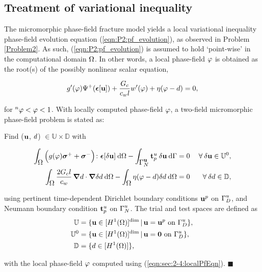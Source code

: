 \documentclass[11pt]{article}
\begin{document}
\subsection{Treatment of variational inequality}\label{sec:VarIneqLinElast}

The micromorphic phase-field fracture model yields a local variational inequality phase-field evolution equation (\ref{eqn:P2:pf_evolution}), as observed in Problem \ref{Problem2}. As such, (\ref{eqn:P2:pf_evolution}) is assumed to hold `point-wise' in the computational domain $\hbox{$\Omega$}$. In other words, a local phase-field $\hbox{$\varphi$}$ is obtained as the root(s) of the possibly nonlinear scalar equation,

\begin{equation}\label{eqn:sec:2-4:localPfEqn}
    g'(\hbox{$\varphi$}) \Psi^+(\hbox{$\hbox{\boldmath$\epsilon$}$}[\hbox{$\mathbf{u}$}]) + \dfrac{\hbox{$G_c$}}{c_w \hbox{$l$}} w'(\hbox{$\varphi$}) + \eta (\hbox{$\varphi$} - \hbox{$d$}) = 0,
\end{equation}

\noindent for ${}^{n}\hbox{$\varphi$} < \hbox{$\varphi$} < 1$. With locally computed phase-field $\hbox{$\varphi$}$, a two-field micromorphic phase-field problem is stated as:


\begin{vproblem}\label{Problem3}
Find ($\hbox{$\mathbf{u}$}$, $\hbox{$d$}$) $\in \mathbb{U} \times \mathbb{D}$ with

\begin{subequations}
\begin{align}
\int_{\hbox{$\Omega$}}^{} \Big( g(\hbox{$\varphi$}) \hbox{$\hbox{\boldmath$\sigma$}^+$} + \hbox{$\hbox{\boldmath$\sigma$}^-$} \Big) \colon\hbox{$\hbox{\boldmath$\epsilon$}$}[\hbox{$\delta\mathbf{u}$}] \: \normalfont \text{d} \hbox{$\Omega$} - \int_{\hbox{$\hbox{$\Gamma$}_{N}^{\scriptsize{\hbox{$\mathbf{u}$}}}$}}^{} \hbox{$\mathbf{t}_{p}^{\scriptsize{\hbox{$u$}}}$} \: \hbox{$\delta\mathbf{u}$} \: \normalfont \text{d}\hbox{$\Gamma$} &= 0  & \: \forall \: \hbox{$\delta\mathbf{u}$} \in \mathbb{U}^0, \label{eqn:P3:EL_momentumbalance} \\
\int_{\hbox{$\Omega$}}^{} \dfrac{2 \hbox{$G_c$} \hbox{$l$}}{c_w} \, \hbox{\boldmath$\nabla$} \hbox{$d$}\cdot \hbox{\boldmath$\nabla$} \hbox{$\delta\hbox{$d$}$} \normalfont \: \text{d}\hbox{$\Omega$} - \int_{\hbox{$\Omega$}}^{} \eta (\hbox{$\varphi$}-\hbox{$d$}) \hbox{$\delta\hbox{$d$}$} \: \text{d}\hbox{$\Omega$} & = 0 & \: \forall \: \hbox{$\delta\hbox{$d$}$} \in \mathbb{D}, \label{eqn:P3:mpf_evolution}
\end{align}
\end{subequations}

\noindent using pertinent time-dependent Dirichlet boundary conditions $\hbox{$\mathbf{u}$}^p$ on $\hbox{$\hbox{$\Gamma$}_{D}^{\scriptsize{u}}$}$, and Neumann boundary condition $\hbox{$\mathbf{t}_{p}^{\scriptsize{u}}$}$ on $\hbox{$\hbox{$\Gamma$}_{N}^{\scriptsize{u}}$}$. The trial and test spaces are defined as
\begin{subequations}
\begin{align}
\mathbb{U} & = \{ \hbox{$\mathbf{u}$} \in [H^1(\hbox{$\Omega$})]^{\normalfont\text{dim}} \,|\, \hbox{$\mathbf{u}$} = \hbox{$\mathbf{u}$}^p \text{ on } \hbox{$\hbox{$\Gamma$}_{D}^{\scriptsize{u}}$} \},  {\label{eqn:P3:disp_trialspace}} \\ 
\mathbb{U}^0 & = \{ \hbox{$\mathbf{u}$} \in [H^1(\hbox{$\Omega$})]^{\normalfont\text{dim}} \,|\, \hbox{$\mathbf{u}$} = \mathbf{0} \text{ on } \hbox{$\hbox{$\Gamma$}_{D}^{\scriptsize{u}}$} \},  {\label{eqn:P3:disp_testspace}} \\
\mathbb{D} & = \{ \hbox{$d$} \in [H^1(\hbox{$\Omega$})] \},  {\label{eqn:P3:trialspace}}
\end{align}
\end{subequations} 

with the local phase-field $\hbox{$\varphi$}$ computed using (\ref{eqn:sec:2-4:localPfEqn}). {\color{black}\hfill $\blacksquare$}
\end{vproblem}
\end{document}
